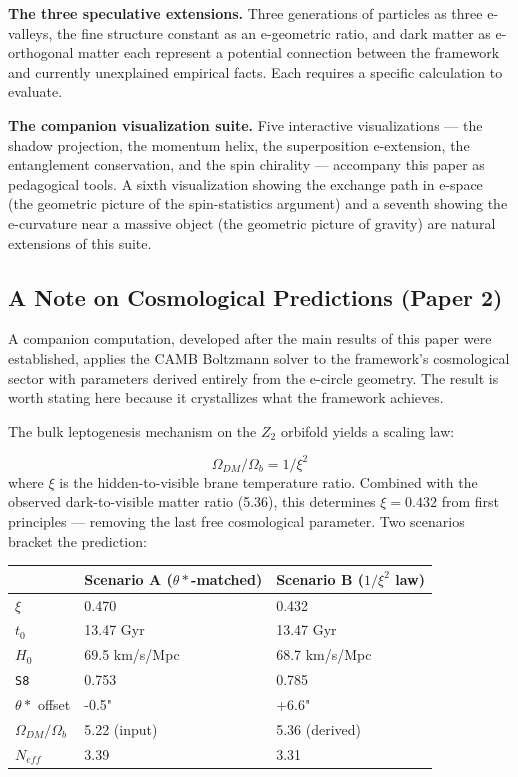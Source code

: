 \documentclass[aps,prd,preprint,superscriptaddress,longbibliography,floatfix]{revtex4-2}
\theoremstyle{remark}
\begin{document}
\textbf{The three speculative extensions.} Three generations of particles as three e-valleys, the fine structure constant as an e-geometric ratio, and dark matter as e-orthogonal matter each represent a potential connection between the framework and currently unexplained empirical facts. Each requires a specific calculation to evaluate.

\textbf{The companion visualization suite.} Five interactive visualizations --- the shadow projection, the momentum helix, the superposition e-extension, the entanglement conservation, and the spin chirality --- accompany this paper as pedagogical tools. A sixth visualization showing the exchange path in e-space (the geometric picture of the spin-statistics argument) and a seventh showing the e-curvature near a massive object (the geometric picture of gravity) are natural extensions of this suite.



\subsection{A Note on Cosmological Predictions (Paper 2)}

A companion computation, developed after the main results of this paper were established, applies the CAMB Boltzmann solver to the framework's cosmological sector with parameters derived entirely from the e-circle geometry. The result is worth stating here because it crystallizes what the framework achieves.

The bulk leptogenesis mechanism on the $Z_{2}$ orbifold yields a scaling law:


\begin{equation}
    \Omega_{DM} / \Omega_b = 1/\xi^{2}
\end{equation}
where $\xi$ is the hidden-to-visible brane temperature ratio. Combined with the observed dark-to-visible matter ratio (5.36), this determines $\xi = 0.432$ from first principles --- removing the last free cosmological parameter. Two scenarios bracket the prediction:


\begin{table}[H]
\begin{ruledtabular}
\begin{tabular}{p{5.0cm}p{5.0cm}p{5.0cm}}
 & Scenario A ($\theta*$-matched) & Scenario B ($1/\xi^{2}$ law) \\
\hline
$\xi$ & 0.470 & 0.432 \\
$t_{0}$ & 13.47 Gyr & 13.47 Gyr \\
$H_{0}$ & 69.5 km/s/Mpc & 68.7 km/s/Mpc \\
\texttt{S8} & 0.753 & 0.785 \\
$\theta*$ offset & -0.5" & +6.6" \\
$\Omega_{DM}/\Omega_b$ & 5.22 (input) & 5.36 (derived) \\
$N_{eff}$ & 3.39 & 3.31 \\
\end{tabular}
\end{ruledtabular}
\end{table}
\end{document}
